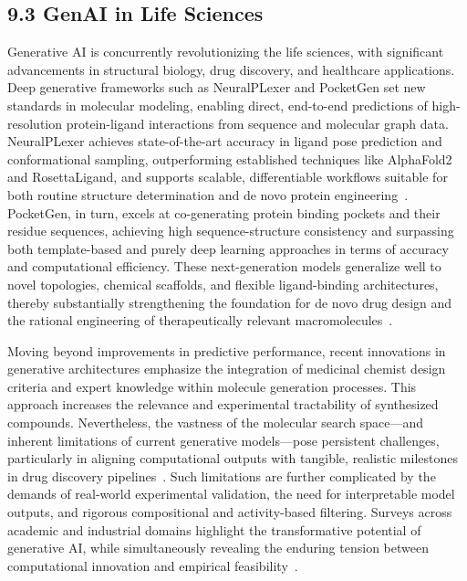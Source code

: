 \documentclass[11pt]{article}
\begin{document}
\subsection{9.3 GenAI in Life Sciences}

Generative AI is concurrently revolutionizing the life sciences, with significant advancements in structural biology, drug discovery, and healthcare applications. Deep generative frameworks such as NeuralPLexer and PocketGen set new standards in molecular modeling, enabling direct, end-to-end predictions of high-resolution protein-ligand interactions from sequence and molecular graph data. NeuralPLexer achieves state-of-the-art accuracy in ligand pose prediction and conformational sampling, outperforming established techniques like AlphaFold2 and RosettaLigand, and supports scalable, differentiable workflows suitable for both routine structure determination and de novo protein engineering~\cite{ref4}. PocketGen, in turn, excels at co-generating protein binding pockets and their residue sequences, achieving high sequence-structure consistency and surpassing both template-based and purely deep learning approaches in terms of accuracy and computational efficiency. These next-generation models generalize well to novel topologies, chemical scaffolds, and flexible ligand-binding architectures, thereby substantially strengthening the foundation for de novo drug design and the rational engineering of therapeutically relevant macromolecules~\cite{ref5}.

Moving beyond improvements in predictive performance, recent innovations in generative architectures emphasize the integration of medicinal chemist design criteria and expert knowledge within molecule generation processes. This approach increases the relevance and experimental tractability of synthesized compounds. Nevertheless, the vastness of the molecular search space—and inherent limitations of current generative models—pose persistent challenges, particularly in aligning computational outputs with tangible, realistic milestones in drug discovery pipelines~\cite{ref6}. Such limitations are further complicated by the demands of real-world experimental validation, the need for interpretable model outputs, and rigorous compositional and activity-based filtering. Surveys across academic and industrial domains highlight the transformative potential of generative AI, while simultaneously revealing the enduring tension between computational innovation and empirical feasibility~\cite{ref6, ref26}.
\end{document}
